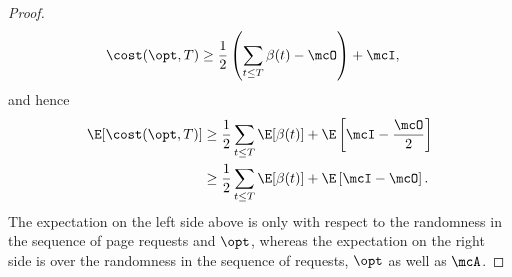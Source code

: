 \begin{proof}
    \begin{align}
        \cost(\opt, T) &\ge \frac{1}{2}\left(\sum_{t \le T}\beta(t) - \mcO \right) + \mcI, \label{eqn:lpr-final-accounting}
    \end{align}
    and hence
    \begin{align*}
        \E[\cost(\opt, T)] &\ge \frac{1}{2}\sum_{t \le T}\E[\beta(t)] + \E\left[\mcI - \frac{\mcO}{2}\right] \\
        &\ge \frac{1}{2}\sum_{t \le T}\E[\beta(t)] + \E\left[\mcI - \mcO\right].
    \end{align*}
    The expectation on the left side above is only with respect to the randomness in the sequence of page requests and $\opt$, whereas the expectation on the right side is over the randomness in the sequence of requests, $\opt$ as well as $\mcA$. 
    

\end{proof}
